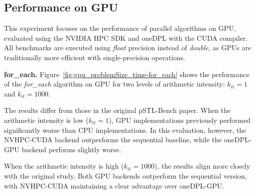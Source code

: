 \documentclass[sigconf]{acmart}
\newcommand{\mypar}[1]{{\bf #1.}}
\begin{document}
\subsection{Performance on GPU}

This experiment focuses on the performance of parallel algorithms on GPU,
evaluated using the NVIDIA HPC SDK and oneDPL with the CUDA compiler. All
benchmarks are executed using \textit{float} precision instead of
\textit{double}, as GPUs are traditionally more efficient with single-precision
operations.

\mypar{for\_each}
Figure~\ref{fig:gpu_problemSize_time-for_each} shows the performance of the
\textit{for\_each} algorithm on GPU for two levels of arithmetic intensity:
$k_{it} = 1$ and $k_{it} = 1000$.

The results differ from those in the original pSTL-Bench paper. When the
arithmetic intensity is low ($k_{it} = 1$), GPU implementations previously
performed significantly worse than CPU implementations. In this evaluation,
however, the NVHPC-CUDA backend outperforms the sequential baseline, while the
oneDPL-GPU backend performs slightly worse.

When the arithmetic intensity is high ($k_{it} = 1000$), the results align more
closely with the original study. Both GPU backends outperform the sequential
version, with NVHPC-CUDA maintaining a clear advantage over oneDPL-GPU.
\end{document}
